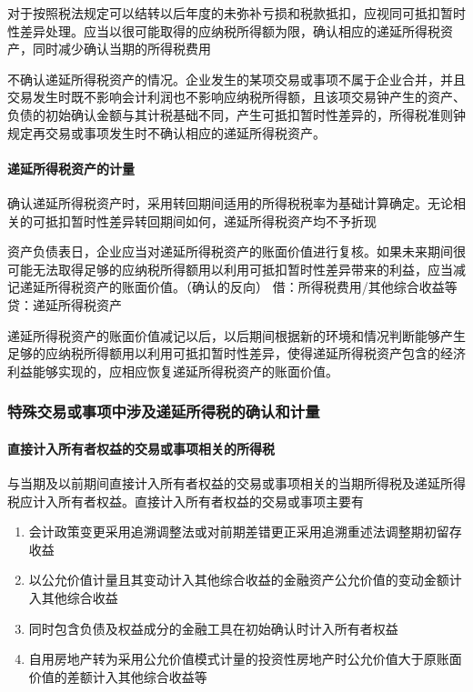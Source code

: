 \documentclass[UTF8,12pt]{ctexart}
\numberwithin{equation}{section} %
\numberwithin{figure}{section}
\numberwithin{table}{section}
\begin{document}
	对于按照税法规定可以结转以后年度的未弥补亏损和税款抵扣，应视同可抵扣暂时性差异处理。应当以很可能取得的应纳税所得额为限，确认相应的递延所得税资产，同时减少确认当期的所得税费用
	
	不确认递延所得税资产的情况。企业发生的某项交易或事项不属于企业合并，并且交易发生时既不影响会计利润也不影响应纳税所得额，且该项交易钟产生的资产、负债的初始确认金额与其计税基础不同，产生可抵扣暂时性差异的，所得税准则钟规定再交易或事项发生时不确认相应的递延所得税资产。
	
	\paragraph{递延所得税资产的计量}
	确认递延所得税资产时，采用转回期间适用的所得税税率为基础计算确定。无论相关的可抵扣暂时性差异转回期间如何，递延所得税资产均不予折现
	
	资产负债表日，企业应当对递延所得税资产的账面价值进行复核。如果未来期间很可能无法取得足够的应纳税所得额用以利用可抵扣暂时性差异带来的利益，应当减记递延所得税资产的账面价值。（确认的反向）
	借：所得税费用/其他综合收益等
	贷：递延所得税资产
	
	递延所得税资产的账面价值减记以后，以后期间根据新的环境和情况判断能够产生足够的应纳税所得额用以利用可抵扣暂时性差异，使得递延所得税资产包含的经济利益能够实现的，应相应恢复递延所得税资产的账面价值。
	
	
	
	\subsubsection{特殊交易或事项中涉及递延所得税的确认和计量}
	\paragraph{直接计入所有者权益的交易或事项相关的所得税}
	与当期及以前期间直接计入所有者权益的交易或事项相关的当期所得税及递延所得税应计入所有者权益。直接计入所有者权益的交易或事项主要有
	\begin{enumerate}
		\item 会计政策变更采用追溯调整法或对前期差错更正采用追溯重述法调整期初留存收益
		
		\item 以公允价值计量且其变动计入其他综合收益的金融资产公允价值的变动金额计入其他综合收益
		
		\item 同时包含负债及权益成分的金融工具在初始确认时计入所有者权益
		
		\item 自用房地产转为采用公允价值模式计量的投资性房地产时公允价值大于原账面价值的差额计入其他综合收益等
	\end{enumerate}
	
\end{document}
